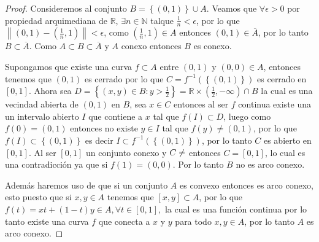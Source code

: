 \documentclass[letterpaper]{article}
\theoremstyle{definition}
\theoremstyle{lemathm}
\theoremstyle{lemathm}
\theoremstyle{lemathm}
\theoremstyle{lemademthm}
\newcommand{\pars}[1]{\left( #1 \right) }
\newcommand{\bracs}[1]{\left[ #1 \right] }
\newcommand{\norm}[1]{\left\lVert#1\right\rVert}
\newcommand{\set}[1]{\left \{ #1 \right\} }
\newcommand{\NN}{\mathbb{N}}
\newcommand{\RR}{\mathbb{R}}
\newcommand{\1}{\mathbbm{1}}
\begin{document}
\begin{enumerate}
\begin{proof}
			Consideremos al conjunto $B = \set{\pars{0,1}} \cup A$. Veamos que $\forall \epsilon > 0$ por propiedad arquimediana de $\RR$, $\exists n\in\NN$ talque $\frac{1}{n} < \epsilon$, por lo que $\norm{\pars{0,1} - \pars{\frac{1}{n},1}} < \epsilon$, como $\pars{\frac{1}{n},1}\in A$ entonces $\pars{0,1}\in \overline{A}$, por lo tanto $B\subset \overline{A}$. Como $A \subset B \subset \overline{A}$ y $A$ conexo entonces $B$ es conexo.

			Supongamos que existe una curva $f\subset A$ entre $\pars{0,1}$ y $\pars{0,0}\in A$, entonces tenemos que $\pars{0,1}$ es cerrado por lo que $C = f^{-1}\pars{\set{\pars{0,1}}}$ es cerrado en $\bracs{0,1}$. Ahora sea $D = \set{\pars{x,y}\in B: y > \frac{1}{2}} = \RR\times(\frac{1}{2},-\infty) \cap B$ la cual es una vecindad abierta de $\pars{0,1}$ en $B$, sea $x\in C$ entonces al ser $f$ continua existe una un intervalo abierto $I$ que contiene a $x$ tal que $f\pars{I} \subset D$, luego como $f\pars{0} = \pars{0,1}$ entonces no existe $y\in I$ tal que $f(y) \neq \pars{0,1}$, por lo que $f\pars{I} \subset \set{\pars{0,1}}$ es decir $I \subset f^{-1}\pars{\set{\pars{0,1}}}$, por lo tanto $C$ es abierto en $\bracs{0,1}$. Al ser $\bracs{0,1}$ un conjunto conexo y $C\neq \empty$ entonces $C = \bracs{0,1}$, lo cual es una contradicción ya que si $f(1) = \pars{0,0}$. Por lo tanto $B$ no es arco conexo.

			Además haremos uso de que si un conjunto $A$ es convexo entonces es arco conexo, esto puesto que si $x,y\in A$ tenemos que $\bracs{x,y}\subset A$, por lo que $f(t) = xt + \pars{1-t}y \in A, \forall t\in\bracs{0,1},$ la cual es una función continua por lo tanto existe una curva $f$ que conecta a $x$ y $y$ para todo $x,y\in A$, por lo tanto $A$ es arco conexo.


\end{proof}
\end{enumerate}
\end{document}

